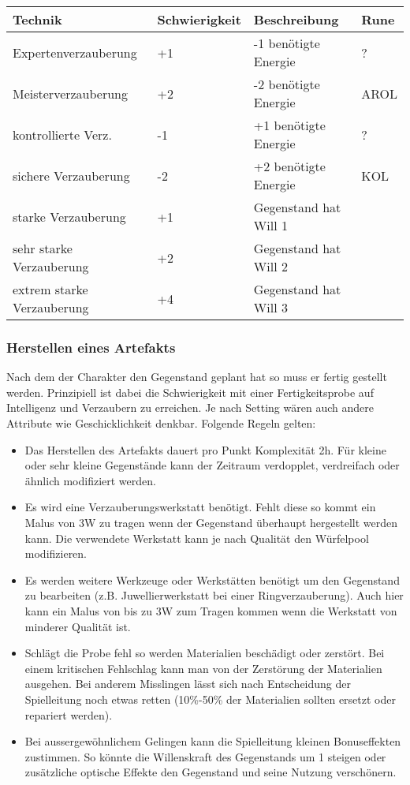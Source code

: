 \documentclass{article}
\begin{document}
\begin{small}
\begin{tabular}{|m{4cm}|m{3cm}|m{4cm}|m{2cm}|}
\hline
\textbf{Technik}&\textbf{Schwierigkeit}&\textbf{Beschreibung}&\textbf{Rune}\\
\hline
\hline
Expertenverzauberung&+1&-1 benötigte Energie&?\\
\hline
Meisterverzauberung&+2&-2 benötigte Energie&AROL\\
\hline
kontrollierte Verz.&-1&+1 benötigte Energie&?\\
\hline
sichere Verzauberung&-2&+2 benötigte Energie&KOL\\
\hline
starke Verzauberung&+1&Gegenstand hat Will 1&\\
\hline
sehr starke Verzauberung&+2&Gegenstand hat Will 2&\\
\hline
extrem starke Verzauberung&+4&Gegenstand hat Will 3&\\
\hline
\end{tabular}
\end{small}

\subsubsection{Herstellen eines Artefakts}

Nach dem der Charakter den Gegenstand geplant hat so muss er fertig gestellt werden. Prinzipiell ist dabei die
Schwierigkeit mit einer Fertigkeitsprobe auf Intelligenz und Verzaubern zu erreichen. Je nach Setting wären auch
andere Attribute wie Geschicklichkeit denkbar. Folgende Regeln gelten:

\begin{itemize}
\item Das Herstellen des Artefakts dauert pro Punkt Komplexität 2h. Für kleine oder sehr kleine Gegenstände kann der Zeitraum verdopplet, verdreifach oder ähnlich modifiziert werden.
\item Es wird eine Verzauberungswerkstatt benötigt. Fehlt diese so kommt ein Malus von 3W zu tragen wenn der Gegenstand überhaupt hergestellt werden kann. Die verwendete Werkstatt kann je nach Qualität den Würfelpool modifizieren.
\item Es werden weitere Werkzeuge oder Werkstätten benötigt um den Gegenstand zu bearbeiten (z.B. Juwellierwerkstatt bei einer Ringverzauberung). Auch hier kann ein Malus von bis zu 3W zum Tragen kommen wenn die Werkstatt von minderer Qualität ist.
\item Schlägt die Probe fehl so werden Materialien beschädigt oder zerstört. Bei einem kritischen Fehlschlag kann man von der Zerstörung der Materialien ausgehen. Bei anderem Misslingen lässt sich nach Entscheidung der Spielleitung noch etwas retten (10\%-50\% der Materialien sollten ersetzt oder repariert werden).
\item Bei aussergewöhnlichem Gelingen kann die Spielleitung kleinen Bonuseffekten zustimmen. So könnte die Willenskraft des Gegenstands um 1 steigen oder zusätzliche optische Effekte den Gegenstand und seine Nutzung verschönern.
\end{itemize}
\end{document}
